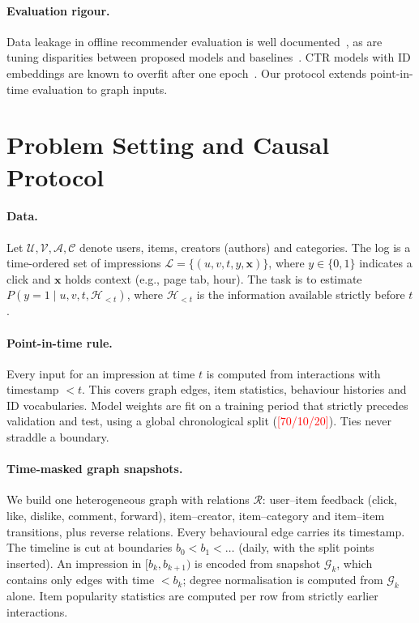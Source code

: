 \documentclass[sigconf,anonymous,review]{acmart}
\newcommand{\tbd}[1]{\textcolor{red}{[#1]}}
\newcommand{\bm}[1]{\boldsymbol{#1}}
\begin{document}
\paragraph{Evaluation rigour.}
Data leakage in offline recommender evaluation is well documented~\cite{ji2023leakage},
as are tuning disparities between proposed models and
baselines~\cite{dacrema2019progress,rendle2020ncf,zhu2021bars}. CTR models
with ID embeddings are known to overfit after one epoch~\cite{zhang2022oneepoch}.
Our protocol extends point-in-time evaluation to graph inputs.

\section{Problem Setting and Causal Protocol}
\label{sec:protocol}

\paragraph{Data.}
Let $\mathcal{U}, \mathcal{V}, \mathcal{A}, \mathcal{C}$ denote users, items,
creators (authors) and categories. The log is a time-ordered set of impressions
$\mathcal{L} = \{(u, v, t, y, \bm{x})\}$, where $y \in \{0,1\}$ indicates a
click and $\bm{x}$ holds context (e.g., page tab, hour). The task is to estimate
$P(y = 1 \mid u, v, t, \mathcal{H}_{<t})$, where $\mathcal{H}_{<t}$ is the
information available strictly before $t$.

\paragraph{Point-in-time rule.}
Every input for an impression at time $t$ is computed from interactions with
timestamp $< t$. This covers graph edges, item statistics, behaviour histories
and ID vocabularies. Model weights are fit on a training period that strictly
precedes validation and test, using a global chronological split
(\tbd{70/10/20}). Ties never straddle a boundary.

\paragraph{Time-masked graph snapshots.}
We build one heterogeneous graph with relations $\mathcal{R}$: user--item
feedback (click, like, dislike, comment, forward), item--creator,
item--category and item--item transitions, plus reverse relations. Every
behavioural edge carries its timestamp. The timeline is cut at boundaries
$b_0 < b_1 < \dots$ (daily, with the split points inserted). An impression in
$[b_k, b_{k+1})$ is encoded from snapshot $\mathcal{G}_k$, which contains only
edges with time $< b_k$; degree normalisation is computed from $\mathcal{G}_k$
alone. Item popularity statistics are computed per row from strictly earlier
interactions.
\end{document}
